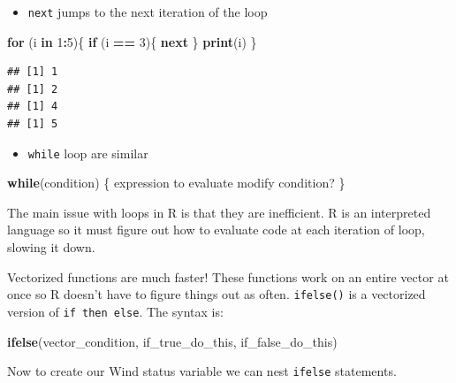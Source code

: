 \documentclass[
]{book}
\newenvironment{Shaded}{\begin{snugshade}}{\end{snugshade}}
\newcommand{\ControlFlowTok}[1]{\textcolor[rgb]{0.13,0.29,0.53}{\textbf{#1}}}
\newcommand{\DecValTok}[1]{\textcolor[rgb]{0.00,0.00,0.81}{#1}}
\newcommand{\KeywordTok}[1]{\textcolor[rgb]{0.13,0.29,0.53}{\textbf{#1}}}
\newcommand{\NormalTok}[1]{#1}
\newcommand{\OperatorTok}[1]{\textcolor[rgb]{0.81,0.36,0.00}{\textbf{#1}}}
\newcommand{\StringTok}[1]{\textcolor[rgb]{0.31,0.60,0.02}{#1}}
\providecommand{\tightlist}{%
  \setlength{\itemsep}{0pt}\setlength{\parskip}{0pt}}
\theoremstyle{definition}
\theoremstyle{definition}
\theoremstyle{definition}
\theoremstyle{remark}
\begin{document}
\begin{itemize}
\tightlist
\item
  \texttt{next} jumps to the next iteration of the loop
\end{itemize}

\begin{Shaded}
\begin{Highlighting}[]
\ControlFlowTok{for}\NormalTok{ (i }\ControlFlowTok{in} \DecValTok{1}\OperatorTok{:}\DecValTok{5}\NormalTok{)\{}
    \ControlFlowTok{if}\NormalTok{ (i }\OperatorTok{==}\StringTok{ }\DecValTok{3}\NormalTok{)\{}
      \ControlFlowTok{next}
\NormalTok{    \} }
  \KeywordTok{print}\NormalTok{(i)}
\NormalTok{\}}
\end{Highlighting}
\end{Shaded}

\begin{verbatim}
## [1] 1
## [1] 2
## [1] 4
## [1] 5
\end{verbatim}

\begin{itemize}
\tightlist
\item
  \texttt{while} loop are similar
\end{itemize}

\begin{Shaded}
\begin{Highlighting}[]
\ControlFlowTok{while}\NormalTok{(condition) \{}
\NormalTok{    expression to evaluate}
\NormalTok{  modify condition?}
\NormalTok{\}}
\end{Highlighting}
\end{Shaded}

The main issue with loops in R is that they are inefficient. R is an interpreted language so it must figure out how to evaluate code at each iteration of loop, slowing it down.

Vectorized functions are much faster! These functions work on an entire vector at once so R doesn't have to figure things out as often. \texttt{ifelse()} is a vectorized version of \texttt{if\ then\ else}. The syntax is:

\begin{Shaded}
\begin{Highlighting}[]
\KeywordTok{ifelse}\NormalTok{(vector_condition, if_true_do_this, if_false_do_this)}
\end{Highlighting}
\end{Shaded}

Now to create our Wind status variable we can nest \texttt{ifelse} statements.
\end{document}
